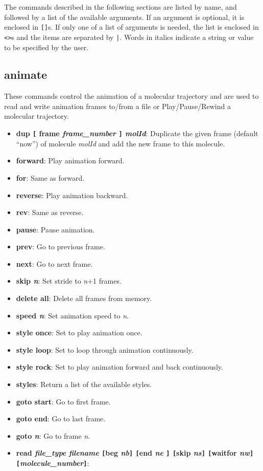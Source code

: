 The commands described in the following sections are listed by name,
and followed by a list of the available arguments.  If an argument is
optional, it is enclosed in {\tt []}s.  If only one of a list of
arguments is needed, the list is enclosed in {\tt <>}s and the items
are separated by {\tt |}.  Words in italics indicate a string or value
to be specified by the user.

  \subsection{animate}
  \label{ug:ui:text:animate}
These commands control the animation of a molecular trajectory and are
used to read and write animation frames to/from a file or
Play/Pause/Rewind a molecular trajectory.
  \begin{itemize}
    \item {\bf dup {\tt [} frame {\it frame\_number} {\tt ]} {\it molId}}: 
	 Duplicate the given frame (default ``now'') of
	molecule {\it molId} and add the new frame to this molecule.
    \item {\bf forward}: Play animation forward.
    \item {\bf for}: Same as forward.
    \item {\bf reverse}: Play animation backward.
    \item {\bf rev}: Same as reverse.
    \item {\bf pause}: Pause animation.
    \item {\bf prev}: Go to previous frame.
    \item {\bf next}: Go to next frame.
    \item {\bf skip {\it n}}: Set stride to {\it n}+1 frames.
    \item {\bf delete all}: Delete all frames from memory.
    \item {\bf speed {\it n}}: Set animation speed to {\it n}.
    \item {\bf style once}: Set to play animation once.
    \item {\bf style loop}: Set to loop through animation continuously.
    \item {\bf style rock}: Set to play animation forward and back continuously.
    \item {\bf styles}: Return a list of the available styles.
    \item {\bf goto start}: Go to first frame.
    \item {\bf goto end}: Go to last frame.
    \item {\bf goto {\it n}}: Go to frame {\it n}.
    \item {\bf read {\it file\_type} {\it filename} {\tt [}beg {\it nb}{\tt ]} {\tt [}end {\it ne}
{\tt ]} {\tt [}skip {\it ns}{\tt ]}  {\tt [}waitfor {\it nw}{\tt ]}
           {\tt [}{\it molecule\_number}{\tt ]}}: 


\end{itemize}
